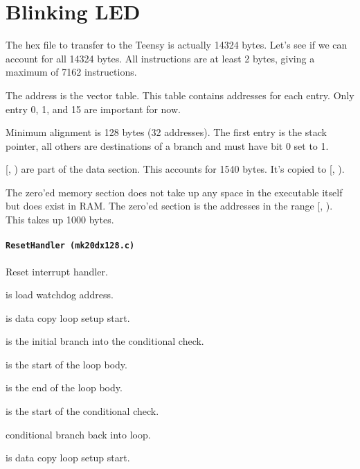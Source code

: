 \newpage
\section{Blinking LED}

The hex file to transfer to the Teensy is actually 14324 bytes.
Let's see if we can account for all 14324 bytes.
All instructions are at least 2 bytes, giving a maximum of 7162 instructions.

The address  is the vector table. This table contains
addresses for each entry. Only entry 0, 1, and 15 are important for now.

Minimum alignment is 128 bytes (32 addresses). The first entry is the stack
pointer, all others are destinations of a branch and must have bit 0 set to 1.

[, ) are part of the data
section. This accounts for 1540 bytes. It's copied to
[, ).

The zero'ed memory section does not take up any space in the executable itself
but does exist in RAM. The zero'ed section is the addresses in the range
[, ).
This takes up 1000 bytes.

\paragraph{\texttt{ResetHandler (mk20dx128.c)}} Reset interrupt handler.

 is load watchdog address.

\vspace{1em}

 is data copy loop setup start.

 is the initial branch into the conditional check.

 is the start of the loop body.

 is the end of the loop body.

 is the start of the conditional check.

 conditional branch back into loop.

\vspace{1em}

 is data copy loop setup start.

